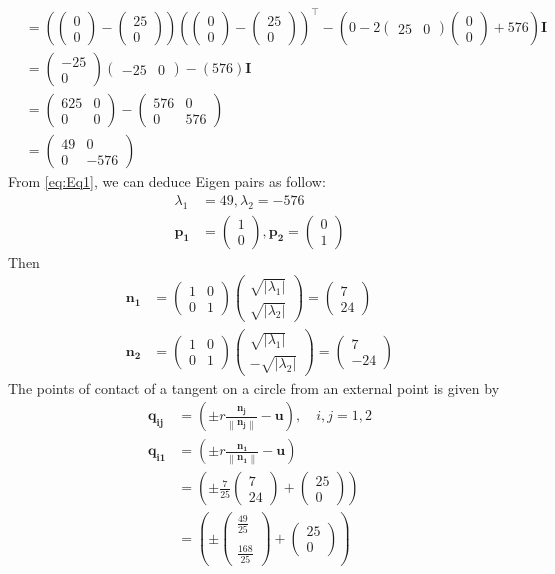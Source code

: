 \documentclass[12pt]{article}
\providecommand{\brak}[1]{\ensuremath{\left(#1\right)}}
\providecommand{\norm}[1]{\left\lVert#1\right\rVert}
\providecommand{\abs}[1]{\left\vert#1\right\vert}
\newcommand{\myvec}[1]{\ensuremath{\begin{pmatrix}#1\end{pmatrix}}}
\let\vec\mathbf
\begin{document}
\begin{enumerate}
\begin{align}
\end{align}
\begin{align}
	&= \brak{\myvec{0\\0}-\myvec{25\\0}}\brak{\myvec{0\\0}-\myvec{25\\0}}^\top - \brak{0-2\myvec{25&0}\myvec{0 \\0}+576}\vec{I} \\ 
	&= \myvec{-25\\0}\myvec{-25&0} - \brak{576}\vec{I} \\ 
	&= \myvec{625&0\\0&0 } - \myvec{576&0\\0&576} \\ 
        \label{eq:Eq1}
	&= \myvec{49&0\\0&-576 } 
\end{align}
From \eqref{eq:Eq1}, we can deduce Eigen pairs as follow: 
\begin{align}
	\lambda_1 &= 49 , \lambda_2 = -576 \\
	\vec{p_1} &= \myvec{1\\0} , \vec{p_2} = \myvec{0\\1}
\end{align}
Then
\begin{align}
	\vec{n_1} &= \myvec{1&0\\0&1}\myvec{\sqrt{\abs{\lambda_1}} \\ \sqrt{\abs{\lambda_2}}} = \myvec{7\\24} \\
	\vec{n_2} &= \myvec{1&0\\0&1}\myvec{\sqrt{\abs{\lambda_1}} \\ -\sqrt{\abs{\lambda_2}}} = \myvec{7\\-24}
\end{align}
The points of contact of a tangent on a circle from an external point is given by 
\begin{align}
	\vec{q_{ij}} &= \brak{\pm r \frac{\vec{n_j}}{\norm{\vec{n_j}}}- \vec{u}},  \quad i,j = 1,2 \\
	\vec{q_{i1}} &= \brak{\pm r \frac{\vec{n_1}}{\norm{\vec{n_1}}}- \vec{u}} \\
	&= \brak{\pm \frac{7}{25}\myvec{7\\24}+ \myvec{25\\0}} \\
	&= \brak{\pm \myvec{\frac{49}{25} \\ \\[1pt] \frac{168}{25}} + \myvec{25\\0}} \\

\end{align}
\end{enumerate}
\end{document}
